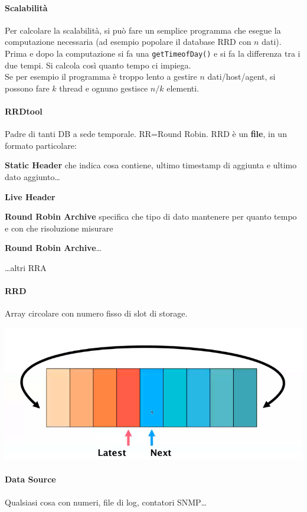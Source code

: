 \documentclass[10pt]{book}
\begin{document}
\paragraph{Scalabilità} Per calcolare la scalabilità, si può fare un semplice programma che esegue la computazione necessaria (ad esempio popolare il database RRD con $n$ dati). Prima e dopo la computazione si fa una \texttt{getTimeofDay()} e si fa la differenza tra i due tempi. Si calcola così quanto tempo ci impiega.\\
Se per esempio il programma è troppo lento a gestire $n$ dati/host/agent, si possono fare $k$ thread e ognuno gestisce $n/k$ elementi.
\paragraph{RRDtool} Padre di tanti DB a sede temporale. RR=Round Robin. RRD è un \textbf{file}, in un formato particolare:
\begin{list}{}{}
	\item \textbf{Static Header} che indica cosa contiene, ultimo timestamp di aggiunta e ultimo dato aggiunto\ldots
	\item \textbf{Live Header} 
	\item \textbf{Round Robin Archive} specifica che tipo di dato mantenere per quanto tempo e con che risoluzione misurare
	\item \textbf{Round Robin Archive}\ldots
	\item \ldots altri RRA
\end{list}
\paragraph{RRD} Array circolare con numero fisso di slot di storage.
\begin{center}
	\includegraphics[scale=0.7]{rrdtool_rr.png}
\end{center}
\paragraph{Data Source} Qualsiasi cosa con numeri, file di log, contatori SNMP\ldots
\end{document}
